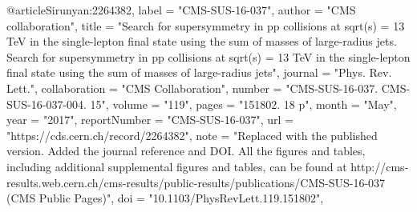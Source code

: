 @article{Sirunyan:2264382,
      label          = "CMS-SUS-16-037",
      author        = "{CMS collaboration}",
      title         = "{Search for supersymmetry in pp collisions at sqrt(s) = 13
                       TeV in the single-lepton final state using the sum of
                       masses of large-radius jets. Search for supersymmetry in pp
                       collisions at sqrt(s) = 13 TeV in the single-lepton final
                       state using the sum of masses of large-radius jets}",
      journal       = "Phys. Rev. Lett.",
      collaboration = "CMS Collaboration",
      number        = "CMS-SUS-16-037. CMS-SUS-16-037-004. 15",
      volume        = "119",
      pages         = "151802. 18 p",
      month         = "May",
      year          = "2017",
      reportNumber  = "CMS-SUS-16-037",
      url           = "https://cds.cern.ch/record/2264382",
      note          = "Replaced with the published version. Added the journal
                       reference and DOI. All the figures and tables, including
                       additional supplemental figures and tables, can be found at
                       http://cms-results.web.cern.ch/cms-results/public-results/publications/CMS-SUS-16-037
                       (CMS Public Pages)",
      doi           = "10.1103/PhysRevLett.119.151802",
}

